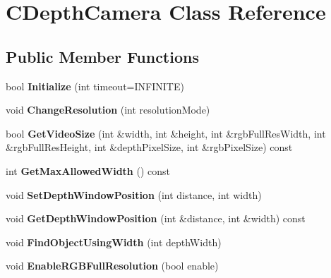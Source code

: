 \hypertarget{classCDepthCamera}{
\section{CDepthCamera Class Reference}
\label{classCDepthCamera}
}
\subsection*{Public Member Functions}
\begin{DoxyCompactItemize}
\item 
\hypertarget{classCDepthCamera_a96a77d7c76328eddee19dac8c506ad10}{
bool {\bfseries Initialize} (int timeout=INFINITE)}
\label{classCDepthCamera_a96a77d7c76328eddee19dac8c506ad10}

\item 
\hypertarget{classCDepthCamera_a44a96495b5cf3a644fecdaacc47f1c81}{
void {\bfseries ChangeResolution} (int resolutionMode)}
\label{classCDepthCamera_a44a96495b5cf3a644fecdaacc47f1c81}

\item 
\hypertarget{classCDepthCamera_aa4e2377f5716a4be08887f1d30b90b45}{
bool {\bfseries GetVideoSize} (int \&width, int \&height, int \&rgbFullResWidth, int \&rgbFullResHeight, int \&depthPixelSize, int \&rgbPixelSize) const }
\label{classCDepthCamera_aa4e2377f5716a4be08887f1d30b90b45}

\item 
\hypertarget{classCDepthCamera_af4e2522bd2bf8bd42521998bbc3f034e}{
int {\bfseries GetMaxAllowedWidth} () const }
\label{classCDepthCamera_af4e2522bd2bf8bd42521998bbc3f034e}

\item 
\hypertarget{classCDepthCamera_a873d46b85b1bafb25d78910a12bd4556}{
void {\bfseries SetDepthWindowPosition} (int distance, int width)}
\label{classCDepthCamera_a873d46b85b1bafb25d78910a12bd4556}

\item 
\hypertarget{classCDepthCamera_a598224eccb8d75dd8ddc73c393ca2373}{
void {\bfseries GetDepthWindowPosition} (int \&distance, int \&width) const }
\label{classCDepthCamera_a598224eccb8d75dd8ddc73c393ca2373}

\item 
\hypertarget{classCDepthCamera_a9caed017bbbeeaa2c70313d33bd7e791}{
void {\bfseries FindObjectUsingWidth} (int depthWidth)}
\label{classCDepthCamera_a9caed017bbbeeaa2c70313d33bd7e791}

\item 
\hypertarget{classCDepthCamera_ad8fd2a78bbadbe27373ab2a1b84e18ab}{
void {\bfseries EnableRGBFullResolution} (bool enable)}
\label{classCDepthCamera_ad8fd2a78bbadbe27373ab2a1b84e18ab}


\end{DoxyCompactItemize}

